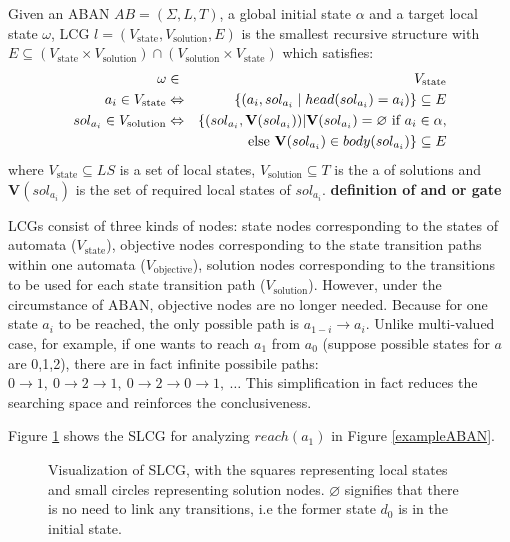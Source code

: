 \begin{definition}\label{defSLCG}
Given an ABAN $AB = (\Sigma,L,T)$, a global initial state $\alpha$ and a target local state $\omega$, LCG $l= (V_{\mathrm{state}},V_{\mathrm{solution}},E)$ is the smallest recursive structure with $E \subseteq (V_{\mathrm{state}}\times V_{\mathrm{solution}})\cap (V_{\mathrm{solution}}\times V_{\mathrm{state}})$ which satisfies:
\begin{eqnarray*}
    \omega&\in& V_{\mathrm{state}} \\
    a_i\in V_{\mathrm{state}} &\Leftrightarrow& \{ (a_i, sol_{a_i}\mid head(sol_{a_i})=a_i)\}\subseteq E \\
    sol_{a_i}\in V_{\mathrm{solution}}&\Leftrightarrow& \{ (sol_{a_i},\mathbf{V}(sol_{a_i}))| \mathbf{V}(sol_{a_i})=\varnothing \text{ \rm if } a_i\in \alpha,\\
    &&\text{ \rm else }\mathbf{V}(sol_{a_i})\in body(sol_{a_i}) \}\subseteq E
\end{eqnarray*}
where $V_{\mathrm{state}}\subseteq LS$ is a set of local states, $V_{\mathrm{solution}}\subseteq T$ is the a of solutions and $\mathbf{V}(sol_{a_i})$ is the set of required local states of $sol_{a_i}$.
\textbf{definition of and or gate}
\end{definition}

\begin{remark}
LCGs consist of three kinds of nodes: state nodes corresponding to the states of automata {\rm($V_{\mathrm{state}}$)}, objective nodes corresponding to the state transition paths within one automata {\rm($V_{\mathrm{objective}}$)}, solution nodes corresponding to the transitions to be used for each state transition path {\rm($V_{\mathrm{solution}}$)}.
However, under the circumstance of ABAN, objective nodes are no longer needed.
Because for one state $a_i$ to be reached, the only possible path is $a_{1-i}\to a_i$.
Unlike multi-valued case, for example, if one wants to reach $a_1$ from $a_0$ (suppose possible states for $a$ are 0,1,2), there are in fact infinite possibile paths: $0\to 1,\ 0\to 2 \to 1,\ 0 \to 2 \to 0 \to 1,\ \ldots$
This simplification in fact reduces the searching space and reinforces the conclusiveness.
\end{remark}

\begin{example}
    Figure \ref{LCGexample} shows the SLCG for analyzing $reach(a_1)$ in Figure \ref{exampleABAN}.
    \begin{figure}[ht]
        \centering
        
        \caption[SLCG]{Visualization of SLCG, with the squares representing local states and small circles representing solution nodes.
        $\varnothing$ signifies that there is no need to link any transitions, i.e the former state $d_0$ is in the initial state.}
        \label{LCGexample}
    \end{figure}
\end{example}

